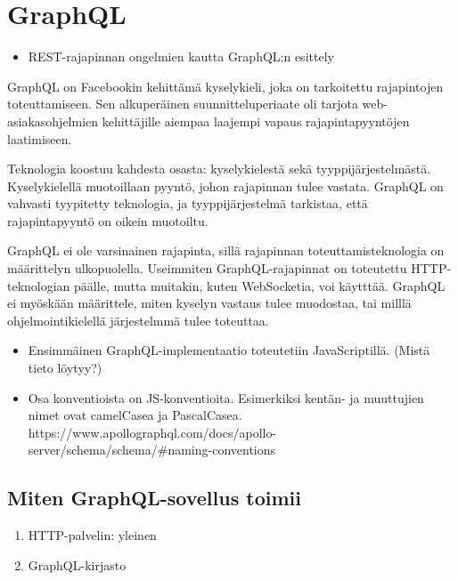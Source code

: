 \hypertarget{graphql}{%
\section{GraphQL}\label{graphql}}

\begin{itemize}
\tightlist
\item
  REST-rajapinnan ongelmien kautta GraphQL:n esittely
\end{itemize}

GraphQL on Facebookin kehittämä kyselykieli, joka on tarkoitettu
rajapintojen toteuttamiseen. Sen alkuperäinen suunnitteluperiaate oli
tarjota web-asiakasohjelmien kehittäjille aiempaa laajempi vapaus
rajapintapyyntöjen laatimiseen. \cite{graphql:spec}

Teknologia koostuu kahdesta osasta: kyselykielestä sekä
tyyppijärjestelmästä. Kyselykielellä muotoillaan pyyntö, johon
rajapinnan tulee vastata. GraphQL on vahvasti tyypitetty teknologia, ja
tyyppijärjestelmä tarkistaa, että rajapintapyyntö on oikein muotoiltu.

GraphQL ei ole varsinainen rajapinta, sillä rajapinnan
toteuttamisteknologia on määrittelyn ulkopuolella. Useimmiten
GraphQL-rajapinnat on toteutettu HTTP-teknologian päälle, mutta
muitakin, kuten WebSocketia, voi käytttää. GraphQL ei myöskään
määrittele, miten kyselyn vastaus tulee muodostaa, tai milllä
ohjelmointikielellä järjestelmmä tulee toteuttaa.

\begin{itemize}
\tightlist
\item
  Ensimmäinen GraphQL-implementaatio toteutetiin JavaScriptillä. (Mistä
  tieto löytyy?)
\item
  Osa konventioista on JS-konventioita. Esimerkiksi kentän- ja
  muuttujien nimet ovat camelCasea ja PascalCasea.
  https://www.apollographql.com/docs/apollo-server/schema/schema/\#naming-conventions
\end{itemize}

\hypertarget{miten-graphql-sovellus-toimii}{%
\subsection{Miten GraphQL-sovellus
toimii}\label{miten-graphql-sovellus-toimii}}

\begin{enumerate}
\def\labelenumi{\arabic{enumi}.}
\tightlist
\item
  HTTP-palvelin: yleinen
\item
  GraphQL-kirjasto
\end{enumerate}

